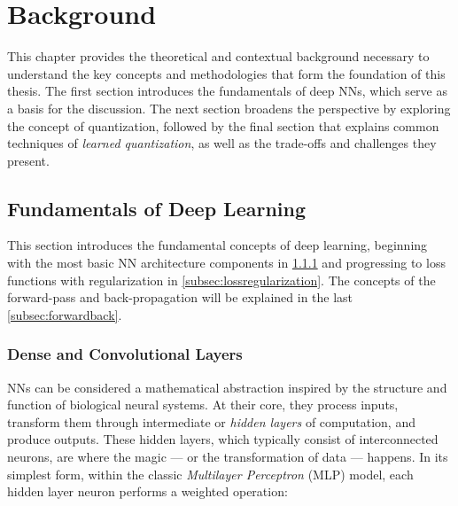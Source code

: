 \chapter{Background\label{cha:chapter2}}

\hspace*{1em}This chapter provides the theoretical and contextual background 
necessary to understand the key concepts and methodologies 
that form the foundation of this thesis.
The first section introduces the fundamentals of deep NNs,
which serve as a basis for the discussion.
The next section broadens the perspective by exploring
the concept of quantization,
followed by the final section that explains common techniques of \textit{learned quantization},
as well as the trade-offs and challenges they present.

\section{Fundamentals of Deep Learning}
\label{sec:deeplearning}
\hspace*{1em}This section introduces the fundamental concepts of deep learning, 
beginning with the most basic NN architecture components in \cref{subsec:denseconvolutional} and progressing to loss functions with regularization in \cref{subsec:lossregularization}. 
The concepts of the forward-pass and back-propagation will be explained in the last \cref{subsec:forwardback}.

\subsection{Dense and Convolutional Layers}
\label{subsec:denseconvolutional}
\hspace*{1em}
NNs can be considered a mathematical abstraction 
inspired by the structure and function of biological neural systems. 
At their core, they process inputs, transform them through intermediate or \textit{hidden layers} of computation, 
and produce outputs.
These hidden layers, which typically consist of interconnected
neurons, are where the magic
 — or the transformation of data — happens. In its simplest form, 
 within the classic \textit{Multilayer Perceptron} (MLP) model,
 each hidden layer neuron performs a weighted operation:

